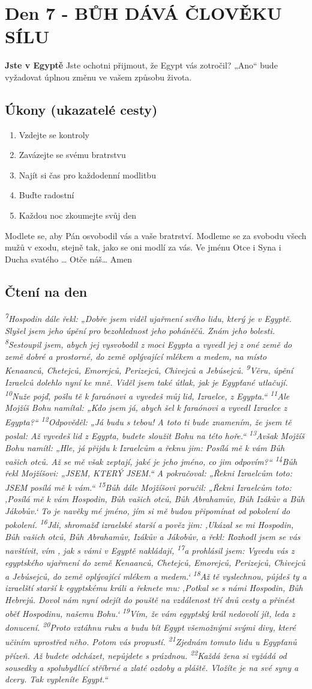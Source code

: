 \documentclass[11pt]{article}
\newcommand{\zacatekPrvniTyden}{
  \textbf{Jste v Egyptě} \newline
  Jste ochotni přijmout, že Egypt vás zotročil? „Ano“ bude vyžadovat úplnou změnu ve vašem způsobu života.

\subsection*{Úkony (ukazatelé cesty)}
\begin{enumerate}
  \item Vzdejte se kontroly
  \item Zavázejte se svému bratrstvu
  \item Najít si čas pro každodenní modlitbu
  \item Buďte radostní
  \item Každou noc zkoumejte svůj den
\end{enumerate}
Modlete se, aby Pán osvobodil vás a vaše bratrství. \newline
Modleme se za svobodu všech mužů v exodu, stejně tak, jako se oni modlí za vás.\newline
Ve jménu Otce i Syna i Ducha svatého …  Otče náš… Amen
}
\begin{document}
\newpage
\section{Den 7 - BŮH DÁVÁ ČLOVĚKU SÍLU}
\zacatekPrvniTyden
\subsection*{Čtení na den}
\textbf{}
\newline
\textit{
\textsuperscript{7}Hospodin dále řekl: „Dobře jsem viděl ujařmení svého lidu, který je v Egyptě. Slyšel jsem jeho úpění pro bezohlednost jeho poháněčů. Znám jeho bolesti.
\textsuperscript{8}Sestoupil jsem, abych jej vysvobodil z moci Egypta a vyvedl jej z oné země do země dobré a prostorné, do země oplývající mlékem a medem, na místo Kenaanců, Chetejců, Emorejců, Perizejců, Chivejců a Jebúsejců.
\textsuperscript{9}Věru, úpění Izraelců dolehlo nyní ke mně. Viděl jsem také útlak, jak je Egypťané utlačují.
\textsuperscript{10}Nuže pojď, pošlu tě k faraónovi a vyvedeš můj lid, Izraelce, z Egypta.“
\textsuperscript{11}Ale Mojžíš Bohu namítal: „Kdo jsem já, abych šel k faraónovi a vyvedl Izraelce z Egypta?“
\textsuperscript{12}Odpověděl: „Já budu s tebou! A toto ti bude znamením, že jsem tě poslal: Až vyvedeš lid z Egypta, budete sloužit Bohu na této hoře.“
\textsuperscript{13}Avšak Mojžíš Bohu namítl: „Hle, já přijdu k Izraelcům a řeknu jim: Posílá mě k vám Bůh vašich otců. Až se mě však zeptají, jaké je jeho jméno, co jim odpovím?“
\textsuperscript{14}Bůh řekl Mojžíšovi: „JSEM, KTERÝ JSEM.“ A pokračoval: „Řekni Izraelcům toto: JSEM posílá mě k vám.“
\textsuperscript{15}Bůh dále Mojžíšovi poručil: „Řekni Izraelcům toto: ‚Posílá mě k vám Hospodin, Bůh vašich otců, Bůh Abrahamův, Bůh Izákův a Bůh Jákobův.‘ To je navěky mé jméno, jím si mě budou připomínat od pokolení do pokolení.
\textsuperscript{16}Jdi, shromažď izraelské starší a pověz jim: ,Ukázal se mi Hospodin, Bůh vašich otců, Bůh Abrahamův, Izákův a Jákobův, a řekl: Rozhodl jsem se vás navštívit, vím , jak s vámi v Egyptě nakládají,
\textsuperscript{17}a prohlásil jsem: Vyvedu vás z egyptského ujařmení do země Kenaanců, Chetejců, Emorejců, Perizejců, Chivejců a Jebúsejců, do země oplývající mlékem a medem.‘
\textsuperscript{18}Až tě vyslechnou, půjdeš ty a izraelští starší k egyptskému králi a řeknete mu: ‚Potkal se s námi Hospodin, Bůh Hebrejů. Dovol nám nyní odejít do pouště na vzdálenost tří dnů cesty a přinést oběť Hospodinu, našemu Bohu.‘
\textsuperscript{19}Vím, že vám egyptský král nedovolí jít, leda z donucení.
\textsuperscript{20}Proto vztáhnu ruku a budu bít Egypt všemožnými svými divy, které učiním uprostřed něho. Potom vás propustí.
\textsuperscript{21}Zjednám tomuto lidu u Egypťanů přízeň. Až budete odcházet, nepůjdete s prázdnou.
\textsuperscript{22}Každá žena si vyžádá od sousedky a spolubydlící stříbrné a zlaté ozdoby a pláště. Vložíte je na své syny a dcery. Tak vypleníte Egypt.“
}
\end{document}
